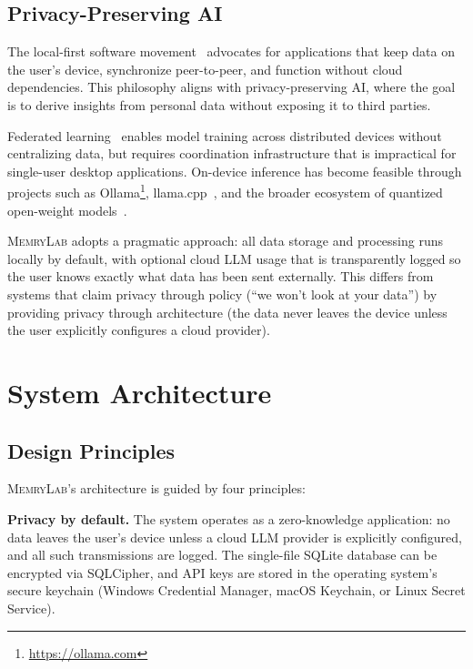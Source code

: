 \documentclass[manuscript,review]{acmart}
\begin{document}
\subsection{Privacy-Preserving AI}
\label{sec:related-privacy}

The local-first software movement~\cite{kleppmann2019localfirst} advocates for applications that keep data on the user's device, synchronize peer-to-peer, and function without cloud dependencies.
This philosophy aligns with privacy-preserving AI, where the goal is to derive insights from personal data without exposing it to third parties.

Federated learning~\cite{mcmahan2017federated} enables model training across distributed devices without centralizing data, but requires coordination infrastructure that is impractical for single-user desktop applications.
On-device inference has become feasible through projects such as Ollama\footnote{\url{https://ollama.com}}, llama.cpp~\cite{gerganov2023llamacpp}, and the broader ecosystem of quantized open-weight models~\cite{dettmers2024qlora}.

\textsc{MemryLab} adopts a pragmatic approach: all data storage and processing runs locally by default, with optional cloud LLM usage that is transparently logged so the user knows exactly what data has been sent externally.
This differs from systems that claim privacy through policy (``we won't look at your data'') by providing privacy through architecture (the data never leaves the device unless the user explicitly configures a cloud provider).


\section{System Architecture}
\label{sec:architecture}

\subsection{Design Principles}
\label{sec:design-principles}

\textsc{MemryLab}'s architecture is guided by four principles:

\textbf{Privacy by default.}
The system operates as a zero-knowledge application: no data leaves the user's device unless a cloud LLM provider is explicitly configured, and all such transmissions are logged.
The single-file SQLite database can be encrypted via SQLCipher, and API keys are stored in the operating system's secure keychain (Windows Credential Manager, macOS Keychain, or Linux Secret Service).
\end{document}
